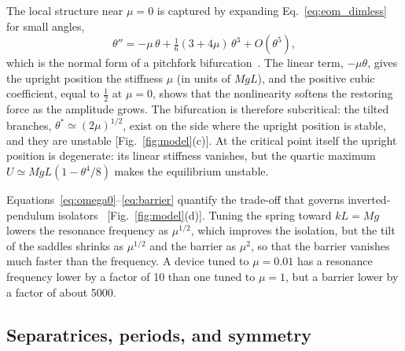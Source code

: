 The local structure near $\mu=0$ is captured by expanding Eq.~\eqref{eq:eom_dimless} for small angles,
\begin{equation}
\theta'' = -\mu\,\theta + \tfrac16(3+4\mu)\,\theta^{3} + O(\theta^{5}),
\label{eq:normal_form}
\end{equation}
which is the normal form of a pitchfork bifurcation~\cite{GuckenheimerHolmes1983,Strogatz2015}. The linear term, $-\mu\theta$, gives the upright position the stiffness $\mu$ (in units of $MgL$), and the positive cubic coefficient, equal to $\frac12$ at $\mu=0$, shows that the nonlinearity softens the restoring force as the amplitude grows. The bifurcation is therefore subcritical: the tilted branches, $\theta^{*}\simeq(2\mu)^{1/2}$, exist on the side where the upright position is stable, and they are unstable [Fig.~\ref{fig:model}(c)]. At the critical point itself the upright position is degenerate: its linear stiffness vanishes, but the quartic maximum $U\simeq MgL(1-\theta^{4}/8)$ makes the equilibrium unstable.

Equations~\eqref{eq:omega0}--\eqref{eq:barrier} quantify the trade-off that governs inverted-pendulum isolators~\cite{Losurdo1999,Takamori2007} [Fig.~\ref{fig:model}(d)]. Tuning the spring toward $kL=Mg$ lowers the resonance frequency as $\mu^{1/2}$, which improves the isolation, but the tilt of the saddles shrinks as $\mu^{1/2}$ and the barrier as $\mu^{2}$, so that the barrier vanishes much faster than the frequency. A device tuned to $\mu=0.01$ has a resonance frequency lower by a factor of 10 than one tuned to $\mu=1$, but a barrier lower by a factor of about 5000.

\subsection{Separatrices, periods, and symmetry}\label{sec:separatrix}

